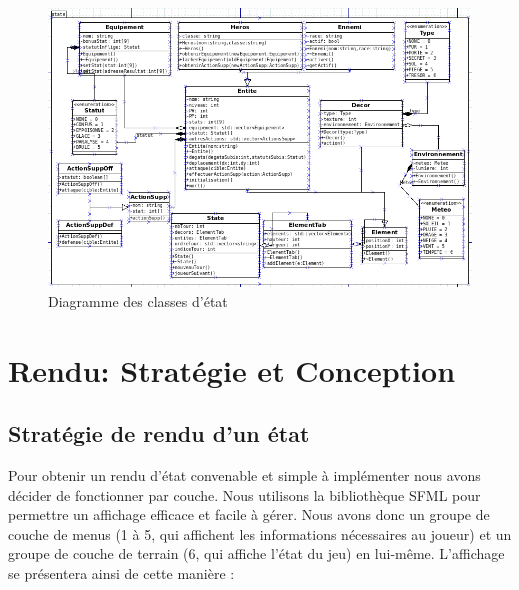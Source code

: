 \documentclass[a4paper,12pt]{article}
\begin{document}
\begin{figure}[hbt!]
    \centering
    \includegraphics[scale=0.8, angle=0]{images/State_dia.png}
    \caption{Diagramme des classes d'état}
    \label{fig:diaClasseEtat}
\end{figure}



\clearpage
\section{Rendu: Stratégie et Conception}

\subsection{Stratégie de rendu d'un état}
Pour obtenir un rendu d'état convenable et simple à implémenter nous avons décider de fonctionner par couche. Nous utilisons la bibliothèque SFML pour permettre un affichage efficace et facile à gérer. Nous avons donc un groupe de couche de menus (1 à 5, qui affichent les informations nécessaires au joueur) et un groupe de couche de terrain (6, qui affiche l'état du jeu) en lui-même. L'affichage se présentera ainsi de cette manière :
\end{document}

